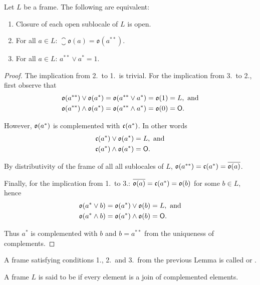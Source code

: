 \begin{lemma}
    Let $L$ be a frame. The following are equivalent:

    \begin{enumerate}
        \item Closure of each open sublocale of $L$ is open.
        \item For all $a \in L$: $\closure{\mathfrak{o}(a)} = \mathfrak{o}(a^{**})$.
        \item For all $a \in L$: $a^{**} \vee a^* = 1$.
    \end{enumerate}
\end{lemma}
\begin{proof}
    The implication from 2.\ to 1.\ is trivial. For the implication from 3.\ to 2., first observe that
    \begin{align*}
        \mathfrak{o}(a^{**})\vee \mathfrak{o}(a^*) &= \mathfrak{o}(a^{**}\vee a^*) = \mathfrak{o}(1) = L, \text{ and} \\
        \mathfrak{o}(a^{**})\wedge \mathfrak{o}(a^*) &= \mathfrak{o}(a^{**}\wedge a^*) = \mathfrak{o}(0) = \mathsf{O}.
    \end{align*}

    \noindent However, $\mathfrak{o}(a^*)$ is complemented with $\mathfrak{c}(a^*)$. In other words
    \begin{align*}
        \mathfrak{c}(a^*)\vee \mathfrak{o}(a^*) &= L, \text{ and} \\
        \mathfrak{c}(a^*)\wedge \mathfrak{o}(a^*) &= \mathsf{O}.
    \end{align*}

    \noindent By distributivity of the frame of all all sublocales of $L$, $\mathfrak{o}(a^{**}) = \mathfrak{c}(a^*) = \overline{\mathfrak{o}(a)}$.

    Finally, for the implication from 1.\ to 3.: $\overline{\mathfrak{o}(a)} = \mathfrak{c}(a^*) = \mathfrak{o}(b)$ for some $b \in L$, hence
    \begin{align*}
        \mathfrak{o}(a^*\vee b) &= \mathfrak{o}(a^*)\vee   \mathfrak{o}(b) = L, \text{ and} \\
        \mathfrak{o}(a^*\wedge b) &= \mathfrak{o}(a^*)\wedge \mathfrak{o}(b) = \mathsf{O}.
    \end{align*}

    \noindent Thus $a^*$ is complemented with $b$ and $b = a^{**}$ from the uniqueness of complements.
\end{proof}

\begin{definition}
    A frame satisfying conditions 1., 2.\ and 3.\ from the previous Lemma is called  or .

    A frame $L$ is said to be  if every element is a join of complemented elements.
\end{definition}

